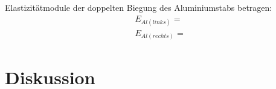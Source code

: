 \justifying Elastizitätmodule der doppelten Biegung des Aluminiumstabs betragen:
\begin{align}
    &E_{Al(links)} = \text{} \label{eq:}\\
    &E_{Al(rechts)} = \text{} \label{eq:}
\end{align}


\section{Diskussion}\justifying

\newpage

\printbibliography
